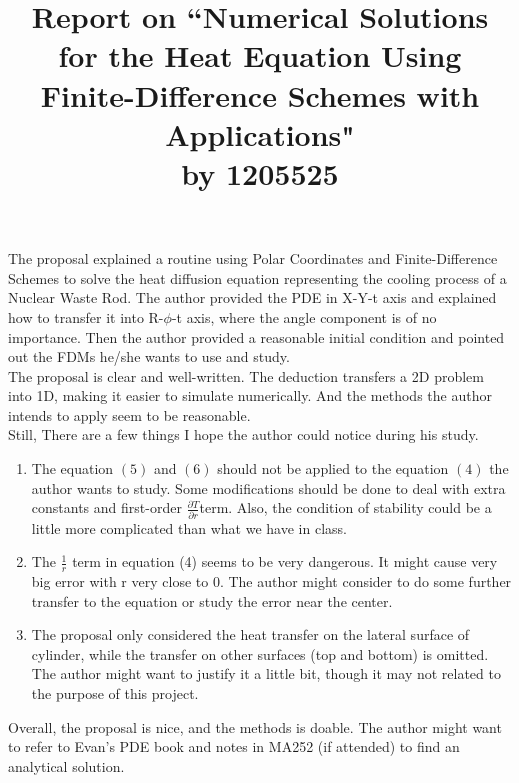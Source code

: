 \documentclass[11pt]{article}
\title{Report on ``Numerical Solutions for the Heat Equation Using Finite-Difference Schemes
with Applications"\\
  by 1205525}
\begin{document}
\normalbaselineskip

\thispagestyle{empty}

\maketitle

The proposal explained a routine using Polar Coordinates and Finite-Difference Schemes to solve the heat diffusion equation representing the cooling process of a Nuclear Waste Rod. The author provided the PDE in X-Y-t axis and explained how to transfer it into R-$\phi$-t axis, where the angle component is of no importance. Then the author provided a reasonable initial condition and pointed out the FDMs he/she wants to use and study.
\\

The proposal is clear and well-written. The deduction transfers a 2D problem into 1D, making it easier to simulate numerically. And the methods the author intends to apply seem to be reasonable.\\

Still, There are a few things I hope the author could notice during his study.\\

\begin{enumerate}


\item The equation $(5)$ and $(6)$ should not be applied to the equation $(4)$ the author wants to study. Some modifications should be done to deal with extra constants and first-order $\frac{\partial T}{\partial r}$term. Also, the condition of stability could be a little more complicated than what we have in class.

\item The $\frac{1}{r}$ term in equation (4) seems to be very dangerous. It might cause very big error with r very close to 0. The author might consider to do some further transfer to the equation or study the error near the center.

\item The proposal only considered the heat transfer on the lateral surface of cylinder, while the transfer on other surfaces (top and bottom) is omitted. The author might want to justify it a little bit, though it may not related to the purpose of this project.

\end{enumerate}

Overall, the proposal is nice, and the methods is doable. The author might want to refer to Evan's PDE book and notes in MA252 (if attended) to find an analytical solution.
\end{document}
